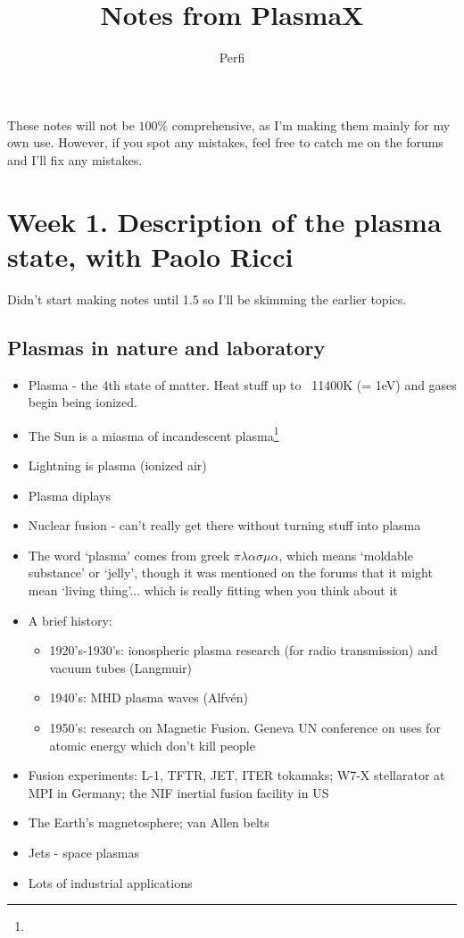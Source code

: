 
\usepackage[utf8]{inputenc}
\usepackage{graphicx}
\title{Notes from PlasmaX}
\author{Perfi}


\maketitle

These notes will not be $100\%$ comprehensive, as I'm making them mainly for my own use. However, if you spot any mistakes, feel free to catch me on the forums and I'll fix any mistakes. 

\section{Week 1. Description of the plasma state, with Paolo Ricci}
Didn't start making notes until 1.5 so I'll be skimming the earlier topics.
	\subsection{Plasmas in nature and laboratory}
		\begin{itemize}
			\item Plasma - the 4th state of matter. Heat stuff up to ~11400K (= 1eV) and gases begin being ionized.
			\item The Sun is a miasma of incandescent plasma\footnote{}
			\item Lightning is plasma (ionized air)
			\item Plasma diplays
			\item Nuclear fusion - can't really get there without turning stuff into plasma
	\item The word `plasma' comes from greek $\pi\lambda\alpha\sigma\mu\alpha$, which means `moldable substance' or `jelly', though it was mentioned on the forums that it might mean `living thing'... which is really fitting when you think about it
			\item A brief history:
				\begin{itemize}
					\item 1920's-1930's: ionospheric plasma research (for radio transmission) and vacuum tubes (Langmuir)
					\item 1940's: MHD plasma waves (Alfvén)
					\item 1950's: research on Magnetic Fusion. Geneva UN conference on uses for atomic energy which don't kill people
				\end{itemize}
			\item Fusion experiments: L-1, TFTR, JET, ITER tokamaks; W7-X stellarator at MPI in Germany; the NIF inertial fusion facility in US
			\item The Earth's magnetosphere; van Allen belts
			\item Jets - space plasmas
			\item Lots of industrial applications
		\end{itemize}
		
